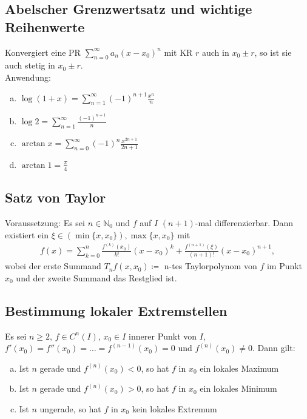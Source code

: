 \subsection{Abelscher Grenzwertsatz und wichtige Reihenwerte}
Konvergiert eine PR $\sum \limits_{n=0}^{\infty} a_n(x-x_0)^n$ mit KR $r$ auch in $x_0 \pm r$, so ist sie auch stetig in $x_0 \pm r$. \\
Anwendung:
\begin{enumerate} [a)]
    \item $\log(1+x) = \sum \limits_{n=1}^{\infty} (-1)^{n+1} \frac{x^n}{n}$
    \item $\log 2 = \sum \limits_{n=1}^{\infty} \frac{(-1)^{n+1}}{n}$
    \item $\arctan x = \sum \limits_{n=0}^{\infty} (-1)^n \frac{x^{2n+1}}{2n+1}$
    \item $\arctan 1 = \frac{\pi}{4}$
\end{enumerate}


\subsection{Satz von Taylor}
Voraussetzung: Es sei $n \in \mathbb{N}_0$ und $f$ auf $I$ $(n+1)$-mal differenzierbar. Dann existiert ein $\xi \in (\min\{x,x_0\}),\max\{x,x_0\}$ mit 
\begin{align*}
    f(x) = \sum \limits_{k=0}^{n} \frac{f^{(k)}(x_0)}{k!} (x-x_0)^k + \frac{f^{(n+1)} (\xi)}{(n+1)!} (x-x_0)^{n+1},
\end{align*}
wobei der erste Summand $T_n f(x,x_0) \coloneqq$ n-tes Taylorpolynom von $f$ im Punkt $x_0$ und der zweite Summand das Restglied ist.

\subsection{Bestimmung lokaler Extremstellen}
Es sei $n \geq 2 \text{, } f \in C^n(I) \text{, } x_0 \in I$ innerer Punkt von $I$, $f'(x_0) = f''(x_0)=\ldots=f^{(n-1)}(x_0)=0$ und $f^{(n)}(x_0) \neq 0$.
Dann gilt:
\begin{enumerate} [a)]
    \item Ist $n$ gerade und $f^{(n)}(x_0)<0$, so hat $f$ in $x_0$ ein lokales Maximum
    \item Ist $n$ gerade und $f^{(n)}(x_0)>0$, so hat $f$ in $x_0$ ein lokales Minimum
    \item Ist $n$ ungerade, so hat $f$ in $x_0$ kein lokales Extremum
\end{enumerate}